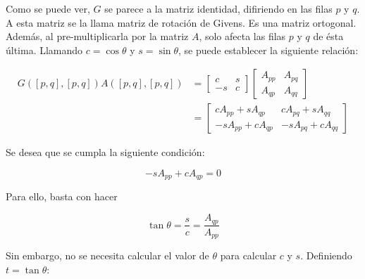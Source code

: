 \documentclass[spanish]{article}
\begin{document}
            
            Como se puede ver, $G$ se parece a la matriz identidad, difiriendo en las filas $p$ y $q$. A esta matriz se la llama matriz de rotación de Givens. Es una matriz ortogonal. Además, al pre-multiplicarla por la matriz $A$, solo afecta las filas $p$ y $q$ de ésta última. Llamando $c = \cos{\theta}$ y $s =\sin{\theta}$, se puede establecer la siguiente relación:
            
            
            \begin{equation}
                \begin{split}
                    G([p,q],[p,q]) A([p,q],[p,q])
                    &=
                        \begin{bmatrix}
                            c & s\\
                            -s & c
                        \end{bmatrix}
                        \begin{bmatrix}
                            A_{pp} & A_{pq}\\
                            A_{qp} & A_{qq}
                        \end{bmatrix}
                    \\
                    &=
                        \begin{bmatrix}
                            c A_{pp} + s A_{qp} & c A_{pq} + s A_{qq}\\
                            -s A_{pp} + c A_{qp} & -s A_{pq} + c A_{qq}
                        \end{bmatrix}
                \end{split}
            \end{equation}
            
            
            Se desea que se cumpla la siguiente condición:
            
            \begin{equation}
                -s A_{p p} + c A_{q p} = 0
            \end{equation}
            
            Para ello, basta con hacer
            
            \begin{equation}
                \tan{\theta} = \dfrac{s}{c} = \dfrac{A_{q p}}{A_{p p }}
            \end{equation}
            
            Sin embargo, no se necesita calcular el valor de $\theta$ para calcular $c$ y $s$. Definiendo $t = \tan{\theta}$:
            
\end{document}
